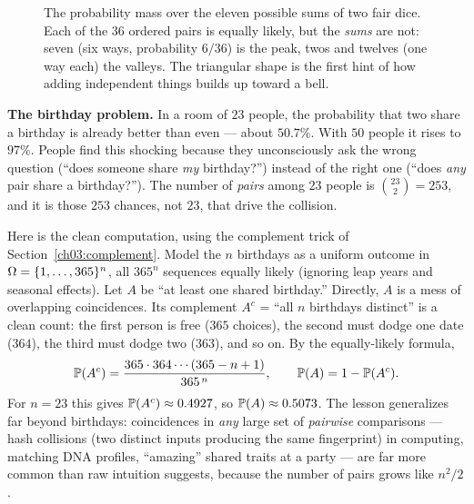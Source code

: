 \begin{figure}[H]
\centering
{}
\caption{The probability mass over the eleven possible sums of two fair dice.
Each of the $36$ ordered pairs is equally likely, but the \emph{sums} are not:
seven (six ways, probability $6/36$) is the peak, twos and twelves (one way each)
the valleys. The triangular shape is the first hint of how adding independent
things builds up toward a bell.}
\label{ch03:fig-dice}
\end{figure}

\begin{paradoxbox}
\textbf{The birthday problem.} In a room of $23$ people, the probability
that two share a birthday is already better than even --- about $50.7\%$. With
$50$ people it rises to $97\%$. People find this shocking because they
unconsciously ask the wrong question (``does someone share \emph{my} birthday?'')
instead of the right one (``does \emph{any} pair share a birthday?''). The number
of \emph{pairs} among $23$ people is $\binom{23}{2} = 253$, and it is those $253$
chances, not $23$, that drive the collision.

Here is the clean computation, using the complement trick of
Section~\ref{ch03:complement}. Model the $n$ birthdays as a uniform outcome in
$\Omega = \set{1,\dots,365}^n$, all $365^n$ sequences equally likely (ignoring
leap years and seasonal effects). Let $A$ be ``at least one shared birthday.''
Directly, $A$ is a mess of overlapping coincidences. Its complement $A^c$ =
``all $n$ birthdays distinct'' is a clean count: the first person is free
($365$ choices), the second must dodge one date ($364$), the third must dodge two
($363$), and so on. By the equally-likely formula,
\[
\P(A^c) = \frac{365 \cdot 364 \cdots (365-n+1)}{365^{\,n}}, \qquad
\P(A) = 1 - \P(A^c).
\]
For $n=23$ this gives $\P(A^c) \approx 0.4927$, so $\P(A) \approx 0.5073$. The
lesson generalizes far beyond birthdays: coincidences in \emph{any} large set of
\emph{pairwise} comparisons --- hash collisions (two distinct inputs producing the same fingerprint) in computing, matching DNA
profiles, ``amazing'' shared traits at a party --- are far more common than raw
intuition suggests, because the number of pairs grows like $n^2/2$.
\end{paradoxbox}

